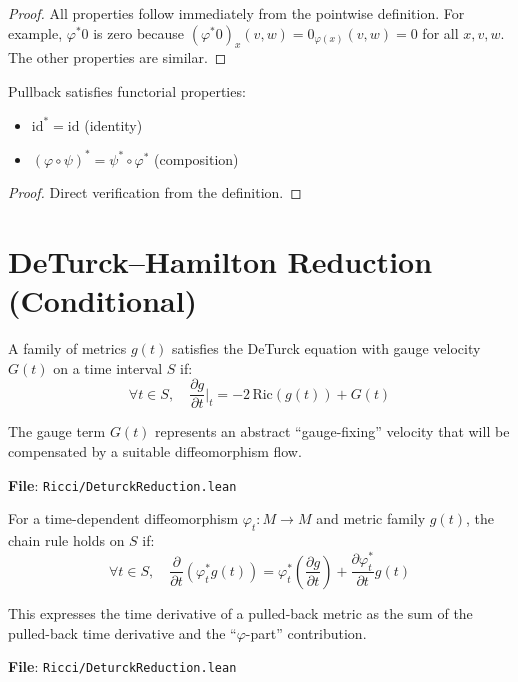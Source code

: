 \begin{proof}
\leanok
{}
All properties follow immediately from the pointwise definition. For example, $\varphi^*0$ is zero because $(\varphi^*0)_x(v,w) = 0_{\varphi(x)}(v,w) = 0$ for all $x, v, w$. The other properties are similar.
\end{proof}

\begin{lemma}
\label{lem:pullback_functoriality}
\leanok
{}
Pullback satisfies functorial properties:
\begin{itemize}
\item $\mathrm{id}^* = \mathrm{id}$ (identity)
\item $(\varphi \circ \psi)^* = \psi^* \circ \varphi^*$ (composition)
\end{itemize}
\end{lemma}

\begin{proof}
\leanok
{}
Direct verification from the definition.
\end{proof}

\section{DeTurck--Hamilton Reduction (Conditional)}

\begin{definition}
\label{def:deturckEqOnWithGauge}
A family of metrics $g(t)$ satisfies the DeTurck equation with gauge velocity $G(t)$ on a time interval $S$ if:
\[ \forall t \in S, \quad \frac{\partial g}{\partial t}\Big|_t = -2 \, \mathrm{Ric}(g(t)) + G(t) \]

The gauge term $G(t)$ represents an abstract ``gauge-fixing'' velocity that will be compensated by a suitable diffeomorphism flow.

\textbf{File}: \texttt{Ricci/DeturckReduction.lean}
\end{definition}

\begin{definition}
\label{def:pullbackChainRuleOn}
For a time-dependent diffeomorphism $\varphi_t : M \to M$ and metric family $g(t)$, the chain rule holds on $S$ if:
\[ \forall t \in S, \quad \frac{\partial}{\partial t}(\varphi_t^* g(t)) = \varphi_t^*\left(\frac{\partial g}{\partial t}\right) + \frac{\partial \varphi_t^*}{\partial t}g(t) \]

This expresses the time derivative of a pulled-back metric as the sum of the pulled-back time derivative and the ``$\varphi$-part'' contribution.

\textbf{File}: \texttt{Ricci/DeturckReduction.lean}
\end{definition}

